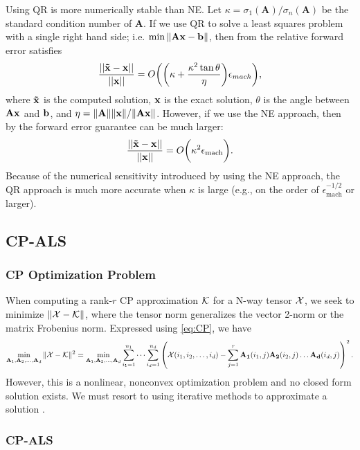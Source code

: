 \documentclass{article}
\newcommand{\mat}[1]{\mathbf{#1}}
\newcommand{\V}[2][]{\bm{#1{\mathbf{\MakeLowercase{#2}}}}} 		%
\newcommand{\T}[2][]{#1{\mathbf{\cal{#2}}}} 						%
\begin{document}
Using QR is more numerically stable than NE. 
Let $\kappa = \sigma_1(\mat{A})/\sigma_n(\mat{A})$ be the standard condition number of $\mat{A}$.
If we use QR to solve a least squares problem with a single right hand side; i.e. $\min\|\mat{A}\V{x} - \V{b} \|$, then from \cite[Eq. (19.2)]{trefethen1997numerical} the relative forward error satisfies
\begin{equation}
  \frac{||\V[\tilde]{x} - \V{x}||}{||\V{x}||} = O \biggl(\biggl(\kappa + \frac{\kappa^2\tan\theta}{\eta}\biggr)\epsilon_{mach}\biggr),
\end{equation}
where $\V[\tilde]{x}$ is the computed solution, $\V{x}$ is the exact solution, $\theta$ is the angle between $\mat{A}\V{x}$ and $\V{b}$, and $\eta = \|\mat{A}\|\|\V{x}\|/\|\mat{A}\V{x}\|$.
However, if we use the NE approach, then by \cite[Eq. (19.3)]{trefethen1997numerical} the forward error guarantee can be much larger: 
\begin{equation}
  \frac{||\V[\tilde]{x} - \V{x}||}{||\V{x}||} = O \biggl(\kappa^2 \epsilon_{\text{mach}}\biggr).
\end{equation}
Because of the numerical sensitivity introduced by using the NE approach, the QR approach is much more accurate when $\kappa$ is large (e.g., on the order of $\epsilon_{\text{mach}}^{-1/2}$ or larger).


\subsection{CP-ALS}

\subsubsection{CP Optimization Problem}

When computing a rank-$r$ CP approximation $\T{K}$ for a N-way tensor $\T{X}$, we seek to minimize $\| \T{X} - \T{K} \|$, where the tensor norm generalizes the vector 2-norm or the matrix Frobenius norm.
Expressed using \cref{eq:CP}, we have  
$$\min_{\mat{A}_1,\mat{A}_2, \dots,\mat{A}_d} \| \T{X} - \T{K} \|^2 = \min_{\mat{A}_1,\mat{A}_2, \dots,\mat{A}_d} \sum_{i_1=1}^{n_1} \cdots \sum_{i_d=1}^{n_d} \left(\T{X}(i_1,i_2,\dots, i_d) - \sum^{r}_{j=1} \mat{A_1}(i_1,j)\mat{A_2}(i_2,j) \dots \mat{A_d}(i_d,j) \right)^2. $$
However, this is a nonlinear, nonconvex optimization problem and no closed form solution exists. 
We must resort to using iterative methods to approximate a solution \cite{kolda2009tensor}.

\subsubsection{CP-ALS}
\end{document}
